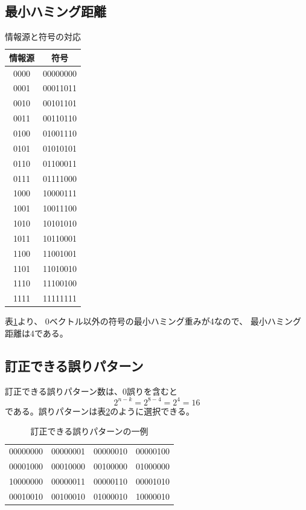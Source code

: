 \documentclass[a4paper,11pt]{jsarticle}
\begin{document}
\subsection{最小ハミング距離}

\begin{table}[hbtp]
  \caption{情報源と符号の対応}
  \label{table:all-code}
  \centering
  \begin{tabular}{|cc|}
    \hline
    情報源 & 符号 \\ \hline \hline
    0000 & 00000000 \\ \hline
    0001 & 00011011 \\ \hline
    0010 & 00101101 \\ \hline
    0011 & 00110110 \\ \hline
    0100 & 01001110 \\ \hline
    0101 & 01010101 \\ \hline
    0110 & 01100011 \\ \hline
    0111 & 01111000 \\ \hline
    1000 & 10000111 \\ \hline
    1001 & 10011100 \\ \hline
    1010 & 10101010 \\ \hline
    1011 & 10110001 \\ \hline
    1100 & 11001001 \\ \hline
    1101 & 11010010 \\ \hline
    1110 & 11100100 \\ \hline
    1111 & 11111111 \\ \hline
  \end{tabular}
\end{table}

表\ref{table:all-code}より、
0ベクトル以外の符号の最小ハミング重みが4なので、
最小ハミング距離は4である。

\subsection{訂正できる誤りパターン}
訂正できる誤りパターン数は、0誤りを含むと
\begin{equation*}
  2^{n-k}=2^{8-4}=2^4=16
\end{equation*}
である。誤りパターンは表\ref{table:error-pattern}のように選択できる。

\begin{table}[hbtp]
  \caption{訂正できる誤りパターンの一例}
  \label{table:error-pattern}
  \centering
  \begin{tabular}{cccc}
    00000000 & 00000001 & 00000010 & 00000100 \\
    00001000 & 00010000 & 00100000 & 01000000 \\
    10000000 & 00000011 & 00000110 & 00001010 \\
    00010010 & 00100010 & 01000010 & 10000010
  \end{tabular}
\end{table}
\end{document}
